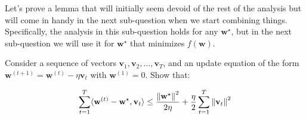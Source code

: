 
Let's prove a lemma that will initially seem devoid of the rest of the analysis but will come 
in handy in the next sub-question when we start combining things. 
Specifically, the analysis in this sub-question holds for any $\mathbf{w}^{\star}$, but in the next sub-question  
we will use it for $\mathbf{w}^{\star}$ that minimizes $f(\mathbf{w})$. 

Consider a sequence of vectors $\mathbf{v}_1, \mathbf{v}_2, ..., \mathbf{v}_T$, 
and an update equation of the form $\mathbf{w}^{(t+1)} = \mathbf{w}^{(t)} - \eta\mathbf{v}_{t}$ 
with $\mathbf{w}^{(1)} = 0$. 
Show that: 

\begin{equation}
\sum_{t=1}^T \langle \mathbf{w}^{(t)}-\mathbf{w}^{\star}, \mathbf{v}_t \rangle \leq
\frac{\left| \hspace{-0.7pt}\left|\mathbf{w}^{\star}\right| \hspace{-0.7pt}\right|^2}{2\eta} + \frac{\eta}{2} \sum_{t=1}^T \left| \hspace{-0.7pt}\left|\mathbf{v}_t\right| \hspace{-0.7pt}\right|^2
\end{equation}